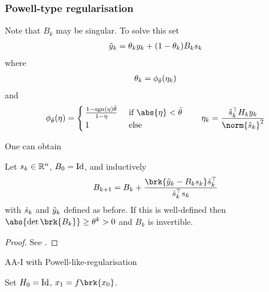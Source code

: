 \begin{frame}	
	\frametitle{Powell-type regularisation}
	Note that $B_k$ may be singular. To solve this set
	\begin{align*}
		\tilde{y}_k=\theta_ky_k+(1-\theta_k)B_ks_k
	\end{align*}
	where
	\begin{align*}
		\theta_k = \phi_{\bar{\theta}}(\eta_k)
	\end{align*}
	and
	\begin{align*}
		\phi_{\bartheta}(\eta) = \begin{cases}
			\frac{1-\sgn(\eta)\bartheta}{1-\eta} &\text{ if }\abs{\eta}<\bartheta \\
			1 &\text{ else }
		\end{cases} \qquad
		\eta_k = \frac{\hs_k^\top H_ky_k}{\norm{\hs_k}^2}
	\end{align*}
\end{frame}

\begin{frame}
	One can obtain
	\begin{lemma}
		Let $s_k\in\mathbb{R}^n$, $B_0=\operatorname{Id}$, and inductively
		\begin{align*}
			B_{k+1} = B_k+\frac{\brk{\tiy_k-B_ks_k}\hs_k^\top}{\hs_k^\top s_k}
		\end{align*}
		with $\hat{s}_k$ and $\tilde{y}_k$ defined as before. If this is well-defined then $\abs{\det\brk{B_k}}\geq \theta^k>0$ and $B_k$ is invertible.
	\end{lemma}
	\begin{proof}
		See \cite[Lemma 2]{ZhaAA}.
	\end{proof}
\end{frame}

\begin{frame}
	\begin{algorithm}[H]
	\caption{AA-I with Powell-like-regularisation}
	\color{gray}
	\BlankLine
	Set $H_0=\operatorname{Id}$, $x_1=f\brk{x_0}$.
	
	\end{algorithm}
\end{frame}

